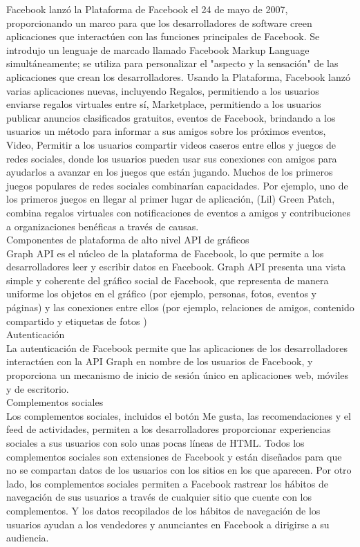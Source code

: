 \begin{itemize}
			Facebook lanzó la Plataforma de Facebook el 24 de mayo de 2007, proporcionando un marco para que los desarrolladores de software creen aplicaciones que interactúen con las funciones principales de Facebook. Se introdujo un lenguaje de marcado llamado Facebook Markup Language simultáneamente; se utiliza para personalizar el "aspecto y la sensación" de las aplicaciones que crean los desarrolladores. Usando la Plataforma, Facebook lanzó varias aplicaciones nuevas, incluyendo Regalos, permitiendo a los usuarios enviarse regalos virtuales entre sí, Marketplace, permitiendo a los usuarios publicar anuncios clasificados gratuitos, eventos de Facebook, brindando a los usuarios un método para informar a sus amigos sobre los próximos eventos, Video, Permitir a los usuarios compartir videos caseros entre ellos y juegos de redes sociales, donde los usuarios pueden usar sus conexiones con amigos para ayudarlos a avanzar en los juegos que están jugando. Muchos de los primeros juegos populares de redes sociales combinarían capacidades. Por ejemplo, uno de los primeros juegos en llegar al primer lugar de aplicación, (Lil) Green Patch, combina regalos virtuales con notificaciones de eventos a amigos y contribuciones a organizaciones benéficas a través de causas. \\
			
			Componentes de plataforma de alto nivel
			API de gráficos\\
			Graph API es el núcleo de la plataforma de Facebook, lo que permite a los desarrolladores leer y escribir datos en Facebook. Graph API presenta una vista simple y coherente del gráfico social de Facebook, que representa de manera uniforme los objetos en el gráfico (por ejemplo, personas, fotos, eventos y páginas) y las conexiones entre ellos (por ejemplo, relaciones de amigos, contenido compartido y etiquetas de fotos )\\
			
			Autenticación\\
			La autenticación de Facebook permite que las aplicaciones de los desarrolladores interactúen con la API Graph en nombre de los usuarios de Facebook, y proporciona un mecanismo de inicio de sesión único en aplicaciones web, móviles y de escritorio.\\
			
			Complementos sociales\\
			Los complementos sociales, incluidos el botón Me gusta, las recomendaciones y el feed de actividades, permiten a los desarrolladores proporcionar experiencias sociales a sus usuarios con solo unas pocas líneas de HTML. Todos los complementos sociales son extensiones de Facebook y están diseñados para que no se compartan datos de los usuarios con los sitios en los que aparecen. Por otro lado, los complementos sociales permiten a Facebook rastrear los hábitos de navegación de sus usuarios a través de cualquier sitio que cuente con los complementos. Y los datos recopilados de los hábitos de navegación de los usuarios ayudan a los vendedores y anunciantes en Facebook a dirigirse a su audiencia.\\
			

\end{itemize}
